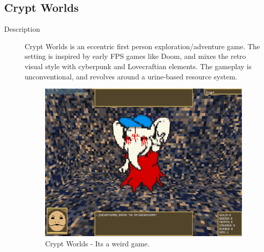 \clearpage
\subsection{Crypt Worlds}
\begin{description}
\item[Description]{Crypt Worlds is an eccentric first person exploration/adventure game. The setting is inspired by early FPS games like Doom, and mixes the retro visual style with cyberpunk and Lovecraftian elements. The gameplay is unconventional, and revolves around a urine-based resource system.

\begin{figure}[htb]
	\centering\includegraphics[width=.25\linewidth]{images/game_crypt_worlds}
	\caption{Crypt Worlds - Its a weird game.}
	\label{fig:crypt_worlds}
\end{figure}}


\end{description}
